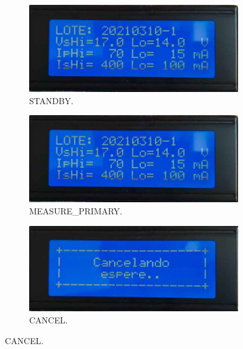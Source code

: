 \begin{figure}[!htpb]
     \centering
     \begin{subfigure}[b]{0.4\textwidth}
         \centering
         \includegraphics[width=1.1\textwidth]{./Figures/pru_fail.jpeg}
         \caption{STANDBY.}
         \label{fig:pruConf_9_1}
     \end{subfigure}
          \hfill
     \begin{subfigure}[b]{0.4\textwidth}
         \centering
         \includegraphics[width=1.1\textwidth]{./Figures/pru_fail.jpeg}
         \caption{MEASURE\_PRIMARY.}
         \label{fig:pruConf_9_2}
     \end{subfigure}
           \hfill
     \begin{subfigure}[b]{0.4\textwidth}
         \centering
         \includegraphics[width=1.1\textwidth]{./Figures/cancel.jpeg}
         \caption{CANCEL.}
         \label{fig:pruConf_9_3}
     \end{subfigure}

\end{figure}
